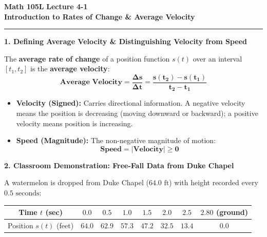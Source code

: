 \documentclass[10.5pt]{article}
\begin{document}
\noindent \textbf{\large Math 105L} \hfill \textbf{\large Lecture 4-1}\\[1pt]
{\textbf{\Large Introduction to Rates of Change \& Average Velocity}}\\[-5pt]
\rule{\textwidth}{1.2pt}

\vspace{0.03in}

\textbf{\large 1. Defining Average Velocity \& Distinguishing Velocity from Speed}

The \textbf{average rate of change} of a position function $s(t)$ over an interval $[t_1, t_2]$ is the \textbf{average velocity}:
\[
  \mathbf{\text{Average Velocity} = \frac{\Delta s}{\Delta t} = \frac{s(t_2) - s(t_1)}{t_2 - t_1}}
\]
\begin{tcolorbox}[colback=boxbg, colframe=boxframe, boxrule=0.8pt, arc=3pt, left=8pt, right=8pt, top=4pt, bottom=4pt]
\begin{itemize}[leftmargin=1.2em, topsep=1pt, itemsep=3pt]
  \item \textbf{Velocity (Signed):} Carries directional information. A negative velocity means the position is decreasing (moving downward or backward); a positive velocity means position is increasing.
  \item \textbf{Speed (Magnitude):} The non-negative magnitude of motion:
  \[
    \mathbf{\text{Speed} = |\text{Velocity}| \ge 0}
  \]
\end{itemize}
\end{tcolorbox}

\vspace{0.03in}

\textbf{\large 2. Classroom Demonstration: Free-Fall Data from Duke Chapel}

A watermelon is dropped from Duke Chapel ($64.0\text{ ft}$) with height recorded every $0.5\text{ seconds}$:
\begin{center}
\begin{tabular}{|c|c|c|c|c|c|c|c|}
  \hline
  Time $t$ (sec) & $0.0$ & $0.5$ & $1.0$ & $1.5$ & $2.0$ & $2.5$ & $2.80$ (ground) \\
  \hline
  Position $s(t)$ (feet) & $64.0$ & $62.9$ & $57.3$ & $47.2$ & $32.5$ & $13.4$ & $0.0$ \\
  \hline
\end{tabular}
\end{center}
\end{document}
